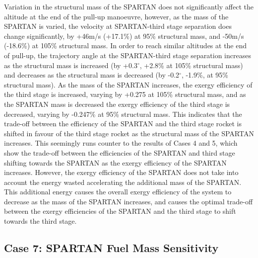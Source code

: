 Variation in the structural mass of the SPARTAN does not significantly affect the altitude at the end of the pull-up manoeuvre, however, as the mass of the SPARTAN is varied, the velocity at SPARTAN-third stage separation does change significantly, by +46m/s (+17.1\%) at 95\% structural mass, and -50m/s (-18.6\%) at 105\% structural mass. In order to reach similar altitudes at the end of pull-up, the trajectory angle at the SPARTAN-third stage separation increases as the structural mass is increased (by +0.3$^\circ$, +2.8\% at 105\% structural mass) and decreases as the structural mass is decreased (by -0.2$^\circ$, -1.9\%, at 95\% structural mass). 
As the mass of the SPARTAN increases, the exergy efficiency of the third stage is increased, varying by +0.275 at 105\% structural mass, and as the SPARTAN mass is decreased the exergy efficiency of the third stage is decreased, varying by -0.247\% at 95\% structural mass. 
This indicates that the trade-off between the efficiency of the SPARTAN and the third stage rocket is shifted in favour of the third stage rocket as the structural mass of the SPARTAN increases. 
This seemingly runs counter to the results of Cases 4 and 5, which show the trade-off between the efficiencies of the SPARTAN and third stage shifting towards the SPARTAN as the exergy efficiency of the SPARTAN increases. 
However, the exergy efficiency of the SPARTAN does not take into account the energy wasted accelerating the additional mass of the SPARTAN. This additional energy causes the overall exergy efficiency of the system to decrease as the mass of the SPARTAN increases, and causes the optimal trade-off between the exergy efficiencies of the SPARTAN and the third stage to shift towards the third stage. 

\subsection{Case 7: SPARTAN Fuel Mass Sensitivity}

